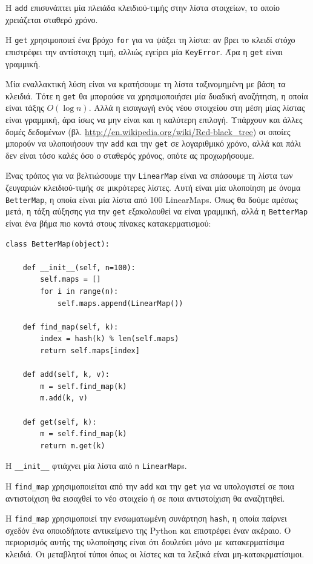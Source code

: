 \documentclass[10pt]{book}
\begin{document}
Η {\tt add} επισυνάπτει μία πλειάδα κλειδιού-τιμής στην λίστα στοιχείων, το οποίο χρειάζεται σταθερό χρόνο.

Η {\tt get} χρησιμοποιεί ένα βρόχο {\tt for} για να ψάξει τη λίστα: αν βρει το κλειδί στόχο επιστρέφει
την αντίστοιχη τιμή, αλλιώς εγείρει μία {\tt KeyError}.  Άρα η {\tt get} είναι γραμμική.

Μία εναλλακτική λύση είναι να κρατήσουμε τη λίστα ταξινομημένη με βάση τα κλειδιά. Τότε η {\tt get} θα
μπορούσε να χρησιμοποιήσει μία δυαδική αναζήτηση, η οποία είναι τάξης $O(\log n)$.  Αλλά η εισαγωγή ενός
νέου στοιχείου στη μέση μίας λίστας είναι γραμμική, άρα ίσως να μην είναι και η καλύτερη επιλογή.
Υπάρχουν και άλλες δομές δεδομένων (βλ. \url{http://en.wikipedia.org/wiki/Red-black_tree}) οι οποίες
μπορούν να υλοποιήσουν την {\tt add} και την {\tt get} σε λογαριθμικό χρόνο, αλλά και πάλι δεν είναι τόσο
καλές όσο ο σταθερός χρόνος, οπότε ας προχωρήσουμε.

Ένας τρόπος για να βελτιώσουμε την {\tt LinearMap} είναι να σπάσουμε τη λίστα των ζευγαριών κλειδιού-τιμής
σε μικρότερες λίστες.  Αυτή είναι μία υλοποίηση με όνομα {\tt BetterMap}, η οποία είναι μία λίστα από 100
LinearMaps.  Όπως θα δούμε αμέσως μετά, η τάξη αύξησης για την {\tt get} εξακολουθεί να είναι γραμμική, αλλά
η {\tt BetterMap} είναι ένα βήμα πιο κοντά στους πίνακες κατακερματισμού:

\begin{verbatim}
class BetterMap(object):

    def __init__(self, n=100):
        self.maps = []
        for i in range(n):
            self.maps.append(LinearMap())

    def find_map(self, k):
        index = hash(k) % len(self.maps)
        return self.maps[index]

    def add(self, k, v):
        m = self.find_map(k)
        m.add(k, v)

    def get(self, k):
        m = self.find_map(k)
        return m.get(k)
\end{verbatim}

Η \verb"__init__" φτιάχνει μία λίστα από {\tt n} {\tt LinearMap}s.

Η \verb"find_map" χρησιμοποιείται από την {\tt add} και την {\tt get} για να υπολογιστεί σε ποια αντιστοίχιση
θα εισαχθεί το νέο στοιχείο ή σε ποια αντιστοίχιση θα αναζητηθεί.

Η \verb"find_map" χρησιμοποιεί την ενσωματωμένη συνάρτηση {\tt hash}, η οποία παίρνει σχεδόν ένα οποιοδήποτε αντικείμενο της Python και επιστρέφει έναν ακέραιο.  Ο περιορισμός αυτής της υλοποίησης είναι ότι δουλεύει 
μόνο με κατακερματίσιμα κλειδιά.  Οι μεταβλητοί τύποι όπως οι λίστες και τα λεξικά είναι μη-κατακρματίσιμοι.
\end{document}
